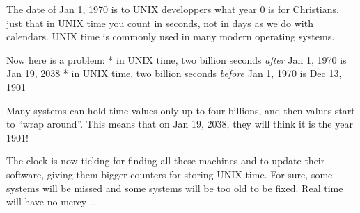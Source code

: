 
The date of Jan 1, 1970 is to UNIX developpers what year 0 is for
Christians, just that in UNIX time you count in seconds, not in days
as we do with calendars. UNIX time is commonly used in many modern operating systems.

Now here is a problem:
* in UNIX time, two billion seconds \emph{after} Jan 1, 1970 is Jan 19, 2038
* in UNIX time, two billion seconds \emph{before} Jan 1, 1970 is Dec 13, 1901

Many systems can hold time values only up to four billions, and
then values start to ``wrap around''. This means that on Jan 19, 2038,
they will think it is the year 1901!

The clock is now ticking for finding all these machines and to
update their software, giving them bigger counters for storing UNIX
time. For sure, some systems will be missed and some systems will be
too old to be fixed. Real time will have no mercy \ldots{}

